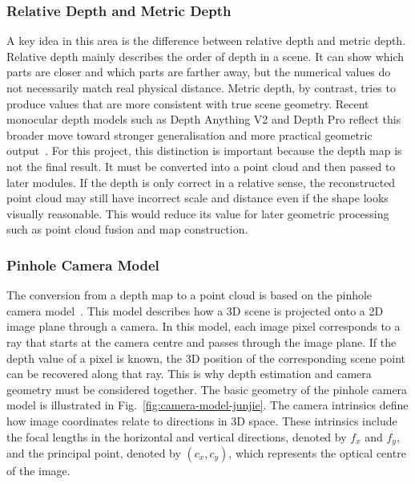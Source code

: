 \documentclass[12pt]{interim_report}
\begin{document}
\subsubsection{Relative Depth and Metric Depth}
\label{subsubsec:relative-metric-depth-junjie-ouyang}

A key idea in this area is the difference between relative depth and metric depth. Relative depth mainly describes the order of depth in a scene. It can show which parts are closer and which parts are farther away, but the numerical values do not necessarily match real physical distance. Metric depth, by contrast, tries to produce values that are more consistent with true scene geometry. Recent monocular depth models such as Depth Anything V2 and Depth Pro reflect this broader move toward stronger generalisation and more practical geometric output~\cite{yang2024,bochkovskii2024}. For this project, this distinction is important because the depth map is not the final result. It must be converted into a point cloud and then passed to later modules. If the depth is only correct in a relative sense, the reconstructed point cloud may still have incorrect scale and distance even if the shape looks visually reasonable. This would reduce its value for later geometric processing such as point cloud fusion and map construction.

\subsubsection{Pinhole Camera Model}
\label{subsubsec:pinhole-camera-model-junjie-ouyang}

The conversion from a depth map to a point cloud is based on the pinhole camera model~\cite{hartley2004}. This model describes how a 3D scene is projected onto a 2D image plane through a camera. In this model, each image pixel corresponds to a ray that starts at the camera centre and passes through the image plane. If the depth value of a pixel is known, the 3D position of the corresponding scene point can be recovered along that ray. This is why depth estimation and camera geometry must be considered together. The basic geometry of the pinhole camera model is illustrated in Fig.~\ref{fig:camera-model-junjie}. The camera intrinsics define how image coordinates relate to directions in 3D space. These intrinsics include the focal lengths in the horizontal and vertical directions, denoted by $f_x$ and $f_y$, and the principal point, denoted by $(c_x,c_y)$, which represents the optical centre of the image.
\end{document}
